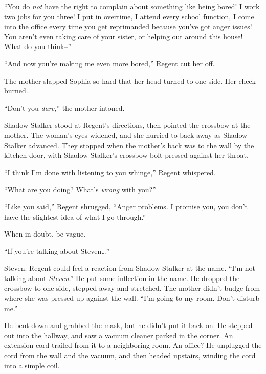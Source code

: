 ``You do \emph{not} have the right to complain about something like being bored!  I work two jobs for you three!  I put in overtime, I attend every school function, I come into the office every time you get reprimanded because you've got anger issues!  You aren't even taking care of your sister, or helping out around this house!  What do you think--''



``And now you're making me even more bored,'' Regent cut her off.



The mother slapped Sophia so hard that her head turned to one side.  Her cheek burned.



``Don't you \emph{dare},'' the mother intoned.



Shadow Stalker stood at Regent's directions, then pointed the crossbow at the mother.  The woman's eyes widened, and she hurried to back away as Shadow Stalker advanced.  They stopped when the mother's back was to the wall by the kitchen door, with Shadow Stalker's crossbow bolt pressed against her throat.



``I think I'm done with listening to you whinge,'' Regent whispered.



``What are you doing?  What's \emph{wrong} with you?''



``Like you said,'' Regent shrugged, ``Anger problems.  I promise you, you don't have the slightest idea of what I go through.''



When in doubt, be vague.



``If you're talking about Steven\ldots''



Steven.  Regent could feel a reaction from Shadow Stalker at the name.  ``I'm not talking about \emph{Steven}.''  He put some inflection in the name.  He dropped the crossbow to one side, stepped away and stretched.  The mother didn't budge from where she was pressed up against the wall.  ``I'm going to my room.  Don't disturb me.''



He bent down and grabbed the mask, but he didn't put it back on.  He stepped out into the hallway, and saw a vacuum cleaner parked in the corner.  An extension cord trailed from it to a neighboring room.  An office?  He unplugged the cord from the wall and the vacuum, and then headed upstairs, winding the cord into a simple coil.



